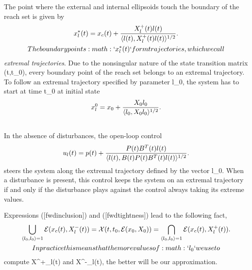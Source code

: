 \documentclass[letterpaper,10pt,english]{sphinxmanual}
\begin{document}
The point where the external and internal ellipsoids touch the boundary
of the reach set is given by
\begin{gather}
\begin{split}  x_l^*(t) = x_c(t) +
  \frac{X^+_l(t)l(t)}{\langle l(t), X^+_l(t)l(t)\rangle^{1/2}} .\end{split}\notag\\\begin{split}The boundary points :math:`x^*_l(t)` form trajectories, which we call\end{split}\notag
\end{gather}
\emph{extremal trajectories}. Due to the nonsingular nature of the state
transition matrix \Phi(t,t_0), every boundary point of the reach
set belongs to an extremal trajectory. To follow an extremal trajectory
specified by parameter l_0, the system has to start at time
t_0 at initial state
\begin{gather}
\begin{split}x^0_l = x_0 + \frac{X_0l_0}{\langle l_0,X_0l_0\rangle^{1/2}}. \label{x0lct}\end{split}\notag\\\begin{split}\end{split}\notag
\end{gather}
In the absence of disturbances, the open-loop control
\begin{gather}
\begin{split}u_l(t) = p(t) + \frac{P(t)B^T(t)l(t)}{\langle l(t),
B(t)P(t)B^T(t)l(t)\rangle^{1/2}}. \label{uct}\end{split}\notag
\end{gather}
steers the system along the extremal trajectory defined by the vector
l_0. When a disturbance is present, this control keeps the
system on an extremal trajectory if and only if the disturbance plays
against the control always taking its extreme values.

Expressions ({[}fwdinclusion{]}) and ({[}fwdtightness{]}) lead to the following
fact,
\begin{gather}
\begin{split}  \bigcup_{\langle l_0,l_0\rangle=1}{\mathcal E}(x_c(t),X^-_l(t)) =
  {\mathcal X}(t,t_0,{\mathcal E}(x_0,X_0)) =
  \bigcap_{\langle l_0,l_0\rangle=1}{\mathcal E}(x_c(t),X^+_l(t)).\end{split}\notag\\\begin{split}In practice this means that the more values of :math:`l_0` we use to\end{split}\notag
\end{gather}
compute X^+_l(t) and X^-_l(t), the better will be our
approximation.
\end{document}
